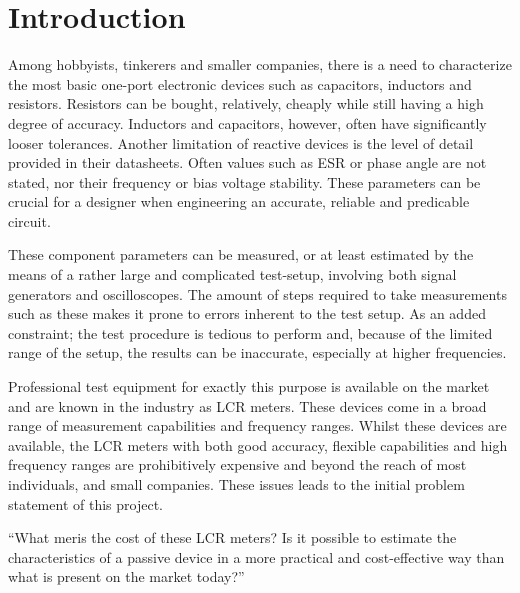 \chapter{Introduction} \label{ch:Introduction}
Among hobbyists, tinkerers and smaller companies, there is a need to characterize the most basic one-port electronic devices such as capacitors, inductors and resistors. Resistors can be bought, relatively, cheaply while still having a high degree of accuracy. Inductors and capacitors, however, often have significantly looser tolerances. Another limitation of reactive devices is the level of detail provided in their datasheets. Often values such as ESR or phase angle are not stated, nor their frequency or bias voltage stability. These parameters can be crucial for a designer when engineering an accurate, reliable and predicable circuit.

These component parameters can be measured, or at least estimated by the means of a rather large and complicated test-setup, involving both signal generators and oscilloscopes. The amount of steps required to take measurements such as these makes it prone to errors inherent to the test setup. As an added constraint; the test procedure is tedious to perform and, because of the limited range of the setup, the results can be inaccurate, especially at higher frequencies.

Professional test equipment for exactly this purpose is available on the market and are known in the industry as LCR meters. These devices come in a broad range of measurement capabilities and frequency ranges. Whilst these devices are available, the LCR meters with both good accuracy, flexible capabilities and high frequency ranges are prohibitively expensive and beyond the reach of most individuals, and small companies. These issues leads to the initial problem statement of this project.

“What meris the cost of these LCR meters? Is it possible to estimate the characteristics of a passive device in a more practical and cost-effective way than what is present on the market today?”
